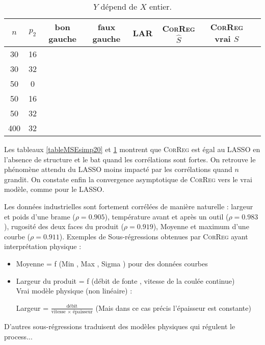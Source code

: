 \documentclass[12pt]{article}
\begin{document}
\begin{table}
\centering
\begin{tabular}{|c|c|c|c|c|c|c|c|}
\hline 
$n$ & $p_2$ & bon gauche & faux gauche    & LAR  &    \textsc{CorReg} $\hat S$& \textsc{CorReg} vrai $S$\\ 
\hline 
30 & 16 &  &  & &   &  \\ 
\hline 
30 & 32 &  &  & &   & \\ 
\hline 
\hline 
50 & 0 &  &  & &   & \\ 
\hline 
50 & 16 &  &  & &   &\\ 
\hline 
50 & 32 &  &  & &   &\\ 
\hline \hline
400 & 32 &  &  & &   & \\ 
\hline 
\end{tabular} 
\caption{$Y$  dépend  de $X$ entier.} \label{tableMSEsimtout}
\end{table}



Les tableaux \ref{tableMSEsimp20} et \ref{tableMSEsimtout} montrent que \textsc{CorReg} est égal au LASSO en l'absence de structure et le bat quand les corrélations sont fortes. On retrouve le phénomène attendu du LASSO moins impacté par les corrélations quand $n$ grandit. On constate enfin la convergence asymptotique de \textsc{CorReg} vers le vrai modèle, comme pour le LASSO.

Les données industrielles sont fortement corrélées de manière naturelle : largeur et poids d'une brame ($\rho=0.905$), température avant et après un outil ($\rho=0.983$), rugosité des deux faces du produit ($\rho=0.919$), Moyenne et maximum d'une courbe ($\rho=0.911$).
Exemples de Sous-régressions obtenues par \textsc{CorReg} ayant interprétation physique :
\begin{itemize}
	\item Moyenne = f (Min , Max , Sigma ) pour des données courbes
	\item Largeur du produit = f (débit de fonte , vitesse de la coulée continue)	\\
Vrai modèle physique (non linéaire) :

	 Largeur = $\frac{\textrm{débit}}{\textrm{vitesse } \times \textrm{ épaisseur}}$ (Mais dans ce cas précis l'épaisseur est constante)
			\end{itemize}
			
			D'autres sous-régressions traduisent des modèles physiques qui régulent le process...
\\
\end{document}
